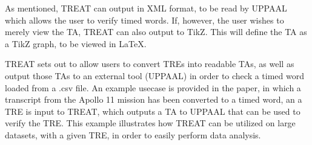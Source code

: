 \documentclass{article}
\begin{document}
As mentioned, TREAT can output in XML format, to be read by UPPAAL which allows the user to verify timed words. If, however, the user wishes to merely view the TA, TREAT can also output to TikZ. This will define the TA as a TikZ graph, to be viewed in LaTeX.

TREAT sets out to allow users to convert TREs into readable TAs, as well as output those TAs to an external tool (UPPAAL) in order to check a timed word loaded from a .csv file.
An example usecase is provided in the paper, in which a transcript from the Apollo 11 mission has been converted to a timed word, an a TRE is input to TREAT, which outputs a TA to UPPAAL that can be used to verify the TRE. This example illustrates how TREAT can be utilized on large datasets, with a given TRE, in order to easily perform data analysis.
\end{document}
